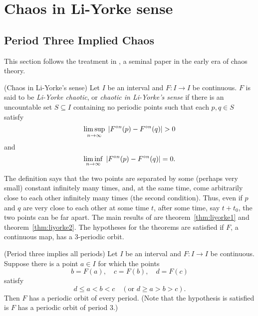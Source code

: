 \documentclass[12pt,draft,twoside]{book}
\begin{document}
\chapter{Chaos in Li-Yorke sense}

\section{Period Three Implied Chaos}
This section follows the treatment in \citet{li-yorke}, a seminal paper in the early era of chaos theory.

\begin{definition}
  (Chaos in Li-Yorke's sense)
  Let $I$ be an interval and $F: I\to I$ be continuous. $F$ is said to be \textit{Li-Yorke chaotic}, or 
  \textit{chaotic in Li-Yorke's sense} if there is an uncountable set $S \subseteq I$ containing no
  periodic points such that each $p,q \in S$ satisfy
  \begin{equation*}
    \limsup\limits_{n \to \infty}\; \left | F^{\circ n}(p) - F^{\circ n}(q) \right | > 0
  \end{equation*}
  and
  \begin{equation*}
    \liminf\limits_{n \to \infty}\; \left | F^{\circ n}(p) - F^{\circ n}(q) \right | = 0.
  \end{equation*}
\end{definition}

The definition says that the two points are separated by some (perhaps very small) constant infinitely many times, and, at the same time, come arbitrarily close to each other infinitely many times (the second condition). 
Thus, even if $p$ and $q$ are very close to each other at some time $t$, after some time, say $t + t_0$, the two points can be far apart.
The main results of \citet{li-yorke} are theorem~\ref{thm:liyorke1} and theorem~\ref{thm:liyorke2}.
The hypotheses for the theorems are satisfied if $F$, a continuous map, has a 3-periodic orbit.

\begin{theorem}
  (Period three implies all periods)
  Let $I$ be an interval and $F: I\to I$ be continuous. Suppose there is a point $a \in I$ for which
  the points
  \begin{equation*}
  b = F(a), \quad c = F(b), \quad d = F(c)
  \end{equation*}
  satisfy
  \begin{equation*}
    d \leq a < b < c \quad(\mbox{or } d \geq a > b > c).
  \end{equation*}
  Then $F$ has a periodic orbit of every period.
  (Note that the hypothesis is satisfied is $F$ has a periodic orbit of period 3.)
  \label{thm:liyorke1}
\end{theorem}
\end{document}
